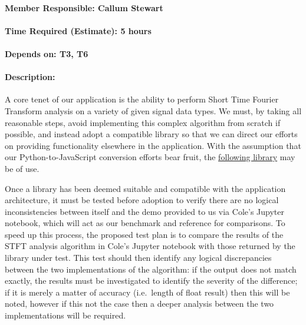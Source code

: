 \documentclass[
  english,
  paper=a4,
  oneside  ,captions=tableheading
]{scrbook}
\begin{document}
\hypertarget{member-responsible-callum-stewart}{%
\paragraph{Member Responsible: Callum
Stewart}\label{member-responsible-callum-stewart}}

\hypertarget{time-required-estimate-5-hours}{%
\paragraph{Time Required (Estimate): 5
hours}\label{time-required-estimate-5-hours}}

\hypertarget{depends-on-t3-t6}{%
\paragraph{Depends on: T3, T6}\label{depends-on-t3-t6}}

\hypertarget{description}{%
\paragraph{Description:}\label{description}}
A core tenet of our application is the ability to perform Short Time Fourier Transform
analysis on a variety of given signal data types. We must, by taking all
reasonable steps, avoid implementing this complex algorithm from scratch
if possible, and instead adopt a compatible library so that we can
direct our efforts on providing functionality elsewhere in the
application. With the assumption that our Python-to-JavaScript
conversion efforts bear fruit, the
\href{https://docs.scipy.org/doc/scipy/reference/generated/scipy.signal.stft.html}{following library} may be of use.

Once a library has been deemed suitable and compatible with the
application architecture, it must be tested before adoption to verify
there are no logical inconsistencies between itself and the demo
provided to us via Cole's Jupyter notebook, which will act as our
benchmark and reference for comparisons. To speed up this process, the
proposed test plan is to compare the results of the STFT analysis
algorithm in Cole's Jupyter notebook with those returned by the library
under test. This test should then identify any logical discrepancies
between the two implementations of the algorithm: if the output does not
match exactly, the results must be investigated to identify the severity
of the difference; if it is merely a matter of accuracy (i.e.~length of
float result) then this will be noted, however if this not the case then
a deeper analysis between the two implementations will be required.
\end{document}
